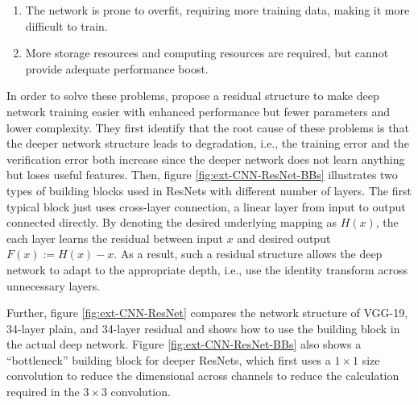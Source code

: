 \begin{enumerate}
    \item The network is prone to overfit, requiring more training data, making it more difficult to train.
    \item More storage resources and computing resources are required, but cannot provide adequate performance boost. 
\end{enumerate}

In order to solve these problems, \citet{he2015deep} propose a residual structure to make deep network training easier with enhanced performance but fewer parameters and lower complexity. 
They first identify that the root cause of these problems is that the deeper network structure leads to degradation, i.e., the training error and the verification error both increase since the deeper network does not learn anything but loses useful features.
Then, figure \ref{fig:ext-CNN-ResNet-BBs} illustrates two types of building blocks used in ResNets with different number of layers.
The first typical block just uses cross-layer connection, a linear layer from input to output connected directly.
By denoting the desired underlying mapping as $H(x)$, the each layer learns the residual between input $x$ and desired output $F(x):=H(x)-x$.
As a result, such a residual structure allows the deep network to adapt to the appropriate depth, i.e., use the identity transform across unnecessary layers.

Further, figure \ref{fig:ext-CNN-ResNet} compares the network structure of VGG-19, 34-layer plain, and 34-layer residual and shows how to use the building block in the actual deep network. 
Figure \ref{fig:ext-CNN-ResNet-BBs} also shows a ``bottleneck'' building block for deeper ResNets, which first uses a $1\times1$ size convolution to reduce the dimensional across channels to reduce the calculation required in the $3\times3$ convolution.

